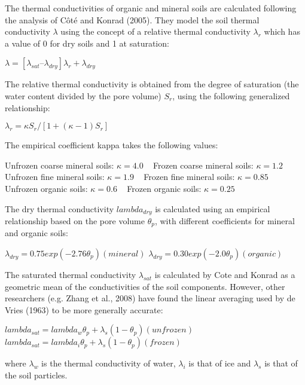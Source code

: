 The thermal conductivities of organic and mineral soils are calculated following the analysis of Côté and Konrad (2005). They model the soil thermal conductivity $\lambda$ using the concept of a relative thermal conductivity $\lambda_r$ which has a value of 0 for dry soils and 1 at saturation\+:

$\lambda = [ \lambda_{sat} – \lambda_{dry} ] \lambda_r + \lambda_{dry}$

The relative thermal conductivity is obtained from the degree of saturation (the water content divided by the pore volume) $S_r$, using the following generalized relationship\+:

$\lambda_r = \kappa S_r/[1 + (\kappa-1) S_r ]$

The empirical coefficient kappa takes the following values\+:

Unfrozen coarse mineral soils\+: $\kappa = 4.0$ ~\newline
Frozen coarse mineral soils\+: $\kappa = 1.2$ ~\newline
Unfrozen fine mineral soils\+: $\kappa = 1.9$ ~\newline
Frozen fine mineral soils\+: $\kappa = 0.85$ ~\newline
Unfrozen organic soils\+: $\kappa = 0.6$ ~\newline
Frozen organic soils\+: $\kappa = 0.25$

The dry thermal conductivity $lambda_{dry}$ is calculated using an empirical relationship based on the pore volume $\theta_p$, with different coefficients for mineral and organic soils\+:

$\lambda_{dry} = 0.75 exp(-2.76 \theta_p) (mineral)$ $\lambda_{dry} = 0.30 exp(-2.0 \theta_p) (organic)$

The saturated thermal conductivity $\lambda_{sat}$ is calculated by Cote and Konrad as a geometric mean of the conductivities of the soil components. However, other researchers (e.\+g. Zhang et al., 2008) have found the linear averaging used by de Vries (1963) to be more generally accurate\+:

$lambda_{sat} = lambda_w \theta_p + \lambda_s (1 - \theta_p) (unfrozen)$ $lambda_{sat} = lambda_i \theta_p + \lambda_s (1 - \theta_p) (frozen)$

where $\lambda_w$ is the thermal conductivity of water, $\lambda_i$ is that of ice and $\lambda_s$ is that of the soil particles.


